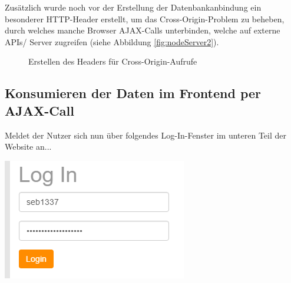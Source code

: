 Zusätzlich wurde noch vor der Erstellung der Datenbankanbindung ein besonderer HTTP-Header erstellt, um das Cross-Origin-Problem zu beheben, durch welches manche Browser AJAX-Calls unterbinden, welche auf externe APIs/ Server zugreifen (siehe Abbildung \vref{fig:nodeServer2}).

\begin{figure}[!h]
	\caption{Erstellen des Headers für Cross-Origin-Aufrufe}
	\label{fig:nodeServer2}
\end{figure}

\subsection{Konsumieren der Daten im Frontend per AJAX-Call}
\label{Konsumieren der Daten im Frontend per AJAX-Call}

Meldet der Nutzer sich nun über folgendes Log-In-Fenster im unteren Teil der Website an...

\includegraphics[scale=0.5]{img/logIn.png}

